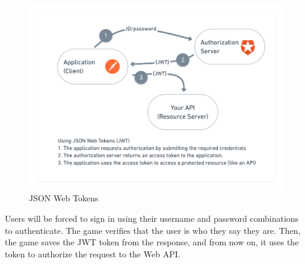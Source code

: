 \begin{figure}
    \centering
    \includegraphics[width=1\linewidth]{assets/design/jwt.png}
    \caption{JSON Web Tokens~\cite{lin_2018_tuck}}
    \label{fig:design:jwt}
\end{figure}

Users will be forced to sign in using their username and password combinations to authenticate.
The game verifies that the user is who they say they are.
Then, the game saves the JWT token from the response, and from now on, it uses the token to authorize the request to the Web API.
